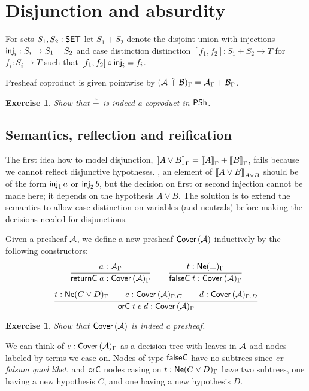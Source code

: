 \documentclass[a4paper]{article}
\newtheorem{exercise}[theorem]{Exercise}
\begin{document}
\section{Disjunction and absurdity}

For sets $S_1,S_2 : \mathsf{SET}$ let $S_1 + S_2$ denote the disjoint union with
injections $\mathsf{inj}_{i} : S_i \to S_1 + S_2$ and case distinction
distinction $[f_1,f_2] : S_1 + S_2 \to T$ for $f_i : S_i \to T$
such that $[f_1,f_2] \circ \mathsf{inj}_{i} = f_i$.

Presheaf coproduct is given pointwise by $(\mathcal{A} \mathrel{\hat{+}} \mathcal{B})_\Gamma = \mathcal{A}_\Gamma + \mathcal{B}_\Gamma$.
\begin{exercise}
  Show that $\mathrel{\hat{+}}$ is indeed a coproduct in $\mathsf{PSh}$.
\end{exercise}


\subsection{Semantics, reflection and reification}

The first idea how to model disjunction,
$\mathopen{{[\kern-0.14em[}} A \lor B \mathclose{{]\kern-0.14em]}}_\Gamma = \mathopen{{[\kern-0.14em[}} A \mathclose{{]\kern-0.14em]}}_\Gamma + \mathopen{{[\kern-0.14em[}} B \mathclose{{]\kern-0.14em]}}_\Gamma$, fails
because we cannot reflect disjunctive hypotheses.  \Eg, an element of
$\mathopen{{[\kern-0.14em[}} A \lor B \mathclose{{]\kern-0.14em]}}_{A \lor B}$ should be of the form $\mathsf{inj}_{1}\,a$ or
$\mathsf{inj}_{2}\,b$, but the decision on first or second injection cannot be
made here;  it depends on the hypothesis $A \lor B$.  The solution is
to extend the semantics to allow case distinction on variables (and
neutrals) before making the decisions needed for disjunctions.

Given a presheaf $\mathcal{A}$, we define a new presheaf $\mathsf{Cover}\,(\mathcal{A})$
inductively by the following constructors:
\begin{gather*}
  \ru{a : \A_\Gamma}{\returnC a : \Cover\A_\Gamma}
\qquad
  \ru{t : \NeG \bot}{\falseC t : \Cover\A_\Gamma}
\\[1ex]
  \ru{t : \NeG{C \lor D} \qquad
      c : \Cover\A_{\Gamma.C} \qquad
      d : \Cover\A_{\Gamma.D}
    }{\orC t c d : \Cover\A_\Gamma}
\end{gather*}
\begin{exercise}
  Show that $\mathsf{Cover}\,(\mathcal{A})$ is indeed a presheaf.
\end{exercise}
We can think of $c : \mathsf{Cover}\,(\mathcal{A})_\Gamma$ as a decision tree with leaves in $\mathcal{A}$
and nodes labeled by terms we case on.  Nodes of type $\mathsf{falseC}$ have
no subtrees since \emph{ex falsum quod libet}, and $\mathsf{orC}$ nodes
casing on $t : \mathsf{Ne}(C \lor D)_{\Gamma}$ have
two subtrees, one having a new hypothesis $C$, and one having a new
hypothesis $D$.
\end{document}

